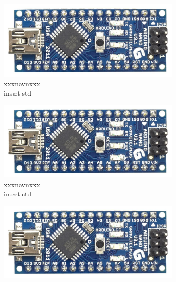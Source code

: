 \begin{titlepage}
\begin{figure}[b!]
    \centering
    \vspace{1mm}
    \begin{subfigure}[1]{0.20\linewidth}
    \includegraphics[width=\linewidth]{Overleaf/Pictures/Frontpage/ardrinon nano.jpg}
    \captionsetup{justification=centering}
    \caption[]{{\small xxxnavnxxx}\\{insæt std}}
    \end{subfigure}
    \hspace{2em}
    \begin{subfigure}[1]{0.20\linewidth}
    \includegraphics[width=\linewidth]{Overleaf/Pictures/Frontpage/ardrinon nano.jpg}
    \captionsetup{justification=centering}
    \caption[]{{\small xxxnavnxxx}\\{insæt std}}
    \end{subfigure}
    \hspace{2em}
    \begin{subfigure}[1]{0.20\linewidth}
    \includegraphics[width=\linewidth]{Overleaf/Pictures/Frontpage/ardrinon nano.jpg}

\end{subfigure}
\end{figure}
\end{titlepage}
